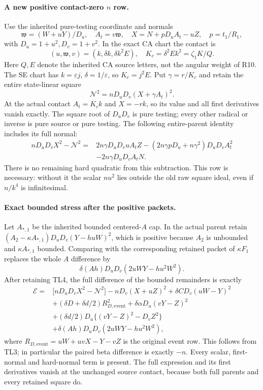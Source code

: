 \paragraph{A new positive contact-zero $n$ row.}
Use the inherited pure-testing coordinate and normals
\[
 \mathfrak w=(W+uY)/D_u,\quad A_t=v\mathfrak w,\quad
 X=N+pD_uA_t-uZ,\quad p=t_1/R_1,
\]
with $D_u=1+u^2,D_v=1+v^2$. In the exact CA chart the contact is
\[
 (u,\mathfrak w,v)=(k,\delta k,\delta k^2E),\quad
 K_c=\delta^2Ek^2=\zeta_1K/Q.
\]
Here $Q,E$ denote the inherited CA source letters, not the angular
weight of R10. The SE chart has $k=\varepsilon j$,
$\delta=1/\varepsilon$, so $K_c=j^2E$.
Put $\gamma=r/K_c$ and retain the entire state-linear square
\[
 \boxed{\quad \mathcal N^2=nD_uD_v(X+\gamma A_t)^2.\quad}
\tag{TL4}
\]
At the actual contact $A_t=K_ck$ and $X=-rk$, so its value and
all first derivatives vanish exactly. The square root of $D_uD_v$ is
pure testing; every other radical or inverse is pure source or pure
testing. The following entire-parent identity includes its full normal:
\[
\begin{split}
 nD_uD_vX^2-\mathcal N^2
 ={}&2n\gamma D_uD_vuA_tZ
 -(2n\gamma pD_u+n\gamma^2)D_uD_vA_t^2\\
 &-2n\gamma D_uD_vA_tN.
\end{split}
\tag{TL5}
\]
There is no remaining hard quadratic from this subtraction. This row
is necessary: without it the scalar $nu^2$ lies outside the old raw
square ideal, even if $n/k^4$ is infinitesimal.

\paragraph{Exact bounded stress after the positive packets.}
Let $A_{*,1}$ be the inherited bounded centered-$A$ cap. In the actual
parent retain $(A_2-\kappa A_{*,1})D_uD_v(Y-huW)^2$, which is positive
because $A_2$ is unbounded and $\kappa A_{*,1}$ bounded. Comparing with
the corresponding retained packet of $\kappa F_1$ replaces the whole
$A$ difference by
\[
 \delta(Ah)D_uD_v(2uWY-hu^2W^2).
\]
After retaining TL4, the full difference of the bounded remainders is
exactly
\[
\begin{split}
 \mathscr E={}&\bigl[nD_uD_vX^2-\mathcal N^2\bigr]
   -nD_v(X+uZ)^2+\delta C D_v(uW-Y)^2\\
 &+(\delta D+\delta d/2)R_{D,\mathrm{event}}^2
   +\delta\alpha D_u(vY-Z)^2\\
 &+(\delta d/2)D_u\{(vY-Z)^2-D_vZ^2\}\\
 &+\delta(Ah)D_uD_v(2uWY-hu^2W^2),
\end{split}
\tag{TL6}
\]
where $R_{D,\mathrm{event}}=uW+uvX-Y-vZ$ is the original event
row. This follows from TL3; in particular the paired beta difference
is exactly $-n$. Every scalar, first-normal and hard-normal term is
present. The full expression and its first derivatives vanish at the
unchanged source contact, because both full parents and every retained
square do.

